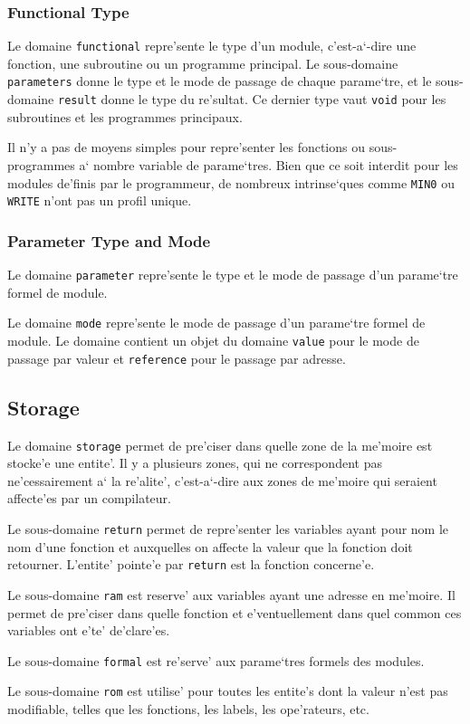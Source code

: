 \subsubsection{Functional Type}
\label{subsubsection-functional}

{ Le domaine \verb/functional/ repre'sente le type d'un module,
c'est-a`-dire une fonction, une subroutine ou un programme principal. Le
sous-domaine \verb/parameters/ donne le type et le mode de passage de
chaque parame`tre, et le sous-domaine \verb/result/ donne le type du
re'sultat. Ce dernier type vaut \verb/void/ pour les subroutines et les
programmes principaux.

Il n'y a pas de moyens simples pour repre'senter les fonctions ou
sous-programmes a` nombre variable de parame`tres. Bien que ce soit
interdit pour les modules de'finis par le programmeur, de nombreux
intrinse`ques comme \verb+MIN0+ ou \verb+WRITE+ n'ont pas un profil
unique.  }

\subsubsection{Parameter Type and Mode}
\label{subsubsection-parameter}

{
Le domaine \verb/parameter/ repre'sente le type et le mode de passage d'un
parame`tre formel de module. 
}

{
Le domaine \verb/mode/ repre'sente le mode de passage d'un parame`tre
formel de module. Le domaine contient un objet du domaine \verb/value/
pour le mode de passage par valeur et \verb/reference/ pour le passage
par adresse.
}

\subsection{Storage}
\label{subsection-storage}

{
Le domaine \verb/storage/ permet de pre'ciser dans quelle zone de la
me'moire est stocke'e une entite'. Il y a plusieurs zones, qui ne
correspondent pas ne'cessairement a` la re'alite', c'est-a`-dire aux
zones de me'moire qui seraient affecte'es par un compilateur.

Le sous-domaine \verb/return/ permet de repre'senter les variables ayant
pour nom le nom d'une fonction et auxquelles on affecte la valeur que la
fonction doit retourner. L'entite' pointe'e par \verb/return/ est la
fonction concerne'e.

Le sous-domaine \verb/ram/ est reserve' aux variables ayant une adresse
en me'moire. Il permet de pre'ciser dans quelle fonction et
e'ventuellement dans quel common ces variables ont e'te' de'clare'es.

Le sous-domaine \verb/formal/ est re'serve' aux parame`tres formels des
modules.

Le sous-domaine \verb/rom/ est utilise' pour toutes les entite's dont la
valeur n'est pas modifiable, telles que les fonctions, les labels, les
ope'rateurs, etc.
}

